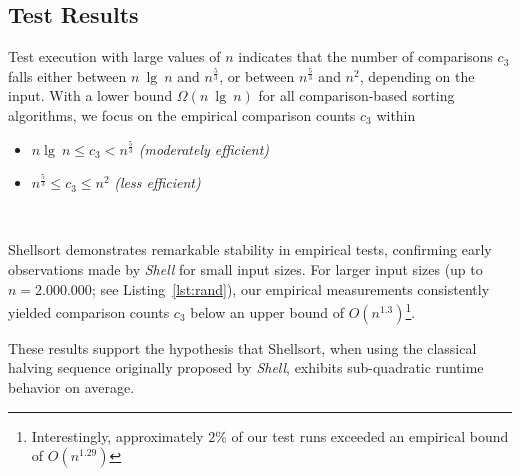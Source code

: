 \subsection{Test Results}

Test execution with large values of $n$ indicates that the number of comparisons $c_3$ falls either between $n\ \lg\ n$ and $n^{\frac{5}{3}}$, or between $n^{\frac{5}{3}}$ and $n^2$, depending on the input.
With a lower bound $\Omega(n\ \lg\ n)$ for all comparison-based sorting algorithms, we focus on the empirical comparison counts $c_3$ within

\begin{itemize}
    \item $n \lg\ n \leq c_3 < n^{\frac{5}{3}}$ \textit{(moderately efficient)}
    \item $n^{\frac{5}{3}} \leq c_3 \leq n^2$ \textit{(less efficient)}
\end{itemize}\\
\vspace{2mm}

\noindent
Shellsort demonstrates remarkable stability in empirical tests, confirming early observations made by \textit{Shell} for small input sizes.
For larger input sizes (up to $n = 2.000.000$; see Listing~\ref{lst:rand}), our empirical measurements consistently yielded comparison counts $c_3$ below an upper bound of $O(n^{1.3})$\footnote{Interestingly, approximately $2\%$ of our test runs exceeded an empirical bound of $O(n^{1.29})$}.

\noindent
These results support the hypothesis that Shellsort, when using the classical halving sequence originally proposed by \textit{Shell}, exhibits sub-quadratic runtime behavior on average.
